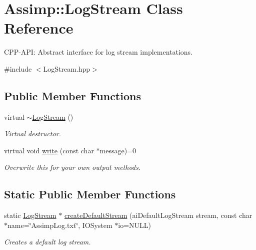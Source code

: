 \hypertarget{classAssimp_1_1LogStream}{\section{\-Assimp\-:\-:\-Log\-Stream \-Class \-Reference}
\label{classAssimp_1_1LogStream}
}


\-C\-P\-P-\/\-A\-P\-I\-: \-Abstract interface for log stream implementations.  




{\ttfamily \#include $<$\-Log\-Stream.\-hpp$>$}

\subsection*{\-Public \-Member \-Functions}
\begin{DoxyCompactItemize}
\item 
\hypertarget{classAssimp_1_1LogStream_a72cabcadc78dcbdd54b5641703057ee7}{virtual \hyperlink{classAssimp_1_1LogStream_a72cabcadc78dcbdd54b5641703057ee7}{$\sim$\-Log\-Stream} ()}\label{classAssimp_1_1LogStream_a72cabcadc78dcbdd54b5641703057ee7}

\begin{DoxyCompactList}\small\item\em \-Virtual destructor. \end{DoxyCompactList}\item 
virtual void \hyperlink{classAssimp_1_1LogStream_ab0bfcb5ab9988ef65d7222a50f6e8d37}{write} (const char $\ast$message)=0
\begin{DoxyCompactList}\small\item\em \-Overwrite this for your own output methods. \end{DoxyCompactList}\end{DoxyCompactItemize}
\subsection*{\-Static \-Public \-Member \-Functions}
\begin{DoxyCompactItemize}
\item 
static \hyperlink{classAssimp_1_1LogStream}{\-Log\-Stream} $\ast$ \hyperlink{classAssimp_1_1LogStream_a6b358a4a79b2e9ba2025e10d3e9405e3}{create\-Default\-Stream} (ai\-Default\-Log\-Stream stream, const char $\ast$name=\char`\"{}\-Assimp\-Log.\-txt\char`\"{}, \-I\-O\-System $\ast$io=\-N\-U\-L\-L)
\begin{DoxyCompactList}\small\item\em \-Creates a default log stream. \end{DoxyCompactList}\end{DoxyCompactItemize}
